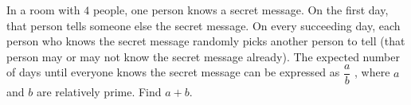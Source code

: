 In a room with $4$ people, one person knows a secret message. On the first day, that person tells someone else the secret message. On every succeeding day, each person who knows the secret message randomly picks another person to tell (that person may or may not know the secret message already). The expected number of days until everyone knows the secret message can be expressed as $\dfrac{a}{b}$ , where $a$ and $b$ are relatively prime. Find $a + b$.
